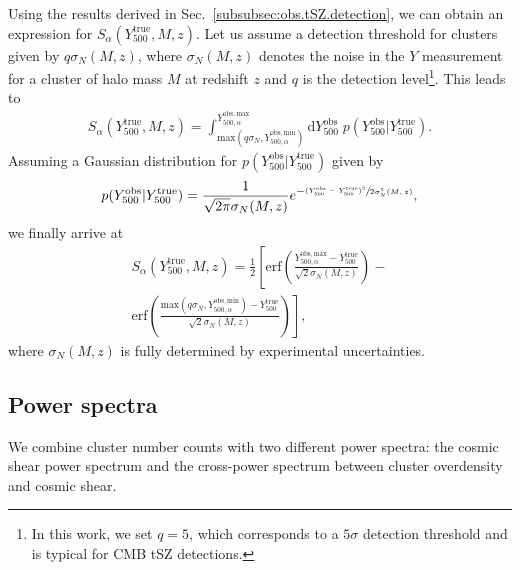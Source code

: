 \documentclass[%
 reprint,
nofootinbib,
 amsmath,amssymb,
 aps,
]{revtex4-1}
\begin{document}
Using the results derived in Sec.~\ref{subsubsec:obs.tSZ.detection}, we can obtain an expression for $S_{\alpha}(Y_{500}^{\mathrm{true}}, M, z)$. Let us assume a detection threshold for clusters given by $q \sigma_{N}(M, z)$, where $\sigma_{N}(M, z)$ denotes the noise in the $Y$ measurement for a cluster of halo mass $M$ at redshift $z$ and $q$ is the detection level\footnote{In this work, we set $q=5$, which corresponds to a $5\sigma$ detection threshold and is typical for CMB tSZ detections.}. This leads to \cite{Alonso:2016}
\begin{equation}
\begin{aligned}
S_{\alpha}(Y_{500}^{\mathrm{true}}, M, z) = \int_{\mathrm{max}(q \sigma_{N}, Y_{500, \alpha}^{\mathrm{obs}, \mathrm{min}})}^{Y_{500, \alpha}^{\mathrm{obs}, \mathrm{max}}} \mathrm{d}Y_{500}^{\mathrm{obs}}\; p(Y_{500}^{\mathrm{obs}}|Y_{500}^{\mathrm{true}}).
\end{aligned}
\end{equation}
Assuming a Gaussian distribution for $p(Y_{500}^{\mathrm{obs}}|Y_{500}^{\mathrm{true}})$ given by \cite{Alonso:2016}
\begin{equation}
p(Y_{500}^{\mathrm{obs}}|Y_{500}^{\mathrm{true}}) = \frac{1}{\sqrt{2\pi}\sigma_{N}(M, z)}e^{-\sfrac{(Y_{500}^{\mathrm{obs}} - Y_{500}^{\mathrm{true}})^{2}}{2 \sigma^{2}_N(M, z)}},
\end{equation}
we finally arrive at \cite{Alonso:2016}
\begin{equation}
\begin{aligned}
S_{\alpha}(Y_{500}^{\mathrm{true}}, M, z)  = \frac{1}{2}\left[\mathrm{erf} \left(\frac{Y_{500, \alpha}^{\mathrm{obs}, \mathrm{max}} - Y_{500}^{\mathrm{true}}}{\sqrt{2}\sigma_{N}(M, z)}\right)\right. - \\
\left.\mathrm{erf} \left(\frac{\mathrm{max}(q \sigma_{N}, Y_{500, \alpha}^{\mathrm{obs}, \mathrm{min}}) - Y_{500}^{\mathrm{true}}}{\sqrt{2}\sigma_{N}(M, z)}\right)\right],
\end{aligned}
\end{equation}
where $\sigma_{N}(M, z)$ is fully determined by experimental uncertainties.

\subsection{Power spectra}\label{subsec:obs.ps}

We combine cluster number counts with two different power spectra: the cosmic shear power spectrum and the cross-power spectrum between cluster overdensity and cosmic shear. 
\end{document}
